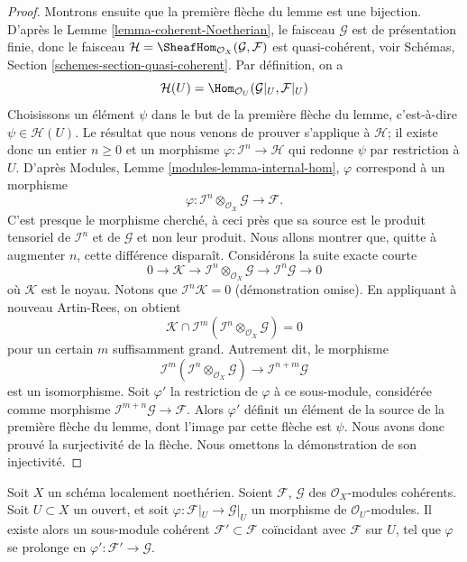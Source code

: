 \begin{proof}
\medskip\noindent
Montrons ensuite que la première flèche du lemme est une bijection.
D'après le Lemme \ref{lemma-coherent-Noetherian}, le faisceau $\mathcal{G}$
est de présentation finie, donc le faisceau
$\mathcal{H} = \SheafHom_{\mathcal{O}_X}(\mathcal{G}, \mathcal{F})$
est quasi-cohérent, voir
Schémas, Section \ref{schemes-section-quasi-coherent}.
Par définition, on a
$$
\mathcal{H}(U)
=
\Hom_{\mathcal{O}_U}(\mathcal{G}|_U, \mathcal{F}|_U)
$$
Choisissons un élément $\psi$ dans le but de la première flèche du
lemme, c'est-à-dire $\psi \in \mathcal{H}(U)$. Le résultat que nous venons de prouver s'applique
à $\mathcal{H}$; il existe donc un entier $n \geq 0$ et un morphisme
$\varphi : \mathcal{I}^n \to \mathcal{H}$ qui redonne
$\psi$ par restriction à $U$. D'après
Modules, Lemme \ref{modules-lemma-internal-hom},
$\varphi$ correspond à un morphisme
$$
\varphi :
\mathcal{I}^n \otimes_{\mathcal{O}_X} \mathcal{G}
\longrightarrow
\mathcal{F}.
$$
C'est presque le morphisme cherché, à ceci près que sa source
est le produit tensoriel de $\mathcal{I}^n$ et de $\mathcal{G}$
et non leur produit. Nous allons montrer que, quitte à augmenter $n$,
cette différence disparaît. Considérons la suite exacte courte
$$
0 \to \mathcal{K} \to
\mathcal{I}^n \otimes_{\mathcal{O}_X} \mathcal{G} \to
\mathcal{I}^n\mathcal{G} \to 0
$$
où $\mathcal{K}$ est le noyau. Notons que
$\mathcal{I}^n\mathcal{K} = 0$ (démonstration omise). En appliquant à nouveau Artin-Rees,
on obtient
$$
\mathcal{K}
\cap
\mathcal{I}^m(\mathcal{I}^n \otimes_{\mathcal{O}_X} \mathcal{G})
=
0
$$
pour un certain $m$ suffisamment grand. Autrement dit, le morphisme
$$
\mathcal{I}^m(\mathcal{I}^n \otimes_{\mathcal{O}_X} \mathcal{G})
\longrightarrow
\mathcal{I}^{n + m}\mathcal{G}
$$
est un isomorphisme. Soit $\varphi'$ la restriction de
$\varphi$ à ce sous-module, considérée comme morphisme
$\mathcal{I}^{m + n}\mathcal{G} \to \mathcal{F}$.
Alors $\varphi'$ définit un élément
de la source de la première flèche du lemme,
dont l'image par cette flèche est $\psi$. Nous avons donc prouvé la surjectivité
de la flèche. Nous omettons la démonstration de son injectivité.
\end{proof}

\begin{lemma}
\label{lemma-extend-coherent}
Soit $X$ un schéma localement noethérien. Soient $\mathcal{F}$, $\mathcal{G}$
des $\mathcal{O}_X$-modules cohérents. Soit $U \subset X$ un ouvert, et
soit $\varphi : \mathcal{F}|_U \to \mathcal{G}|_U$ un morphisme de
$\mathcal{O}_U$-modules. Il existe alors un sous-module cohérent
$\mathcal{F}' \subset \mathcal{F}$ coïncidant avec
$\mathcal{F}$ sur $U$, tel que $\varphi$ se prolonge en
$\varphi' : \mathcal{F}' \to \mathcal{G}$.
\end{lemma}

